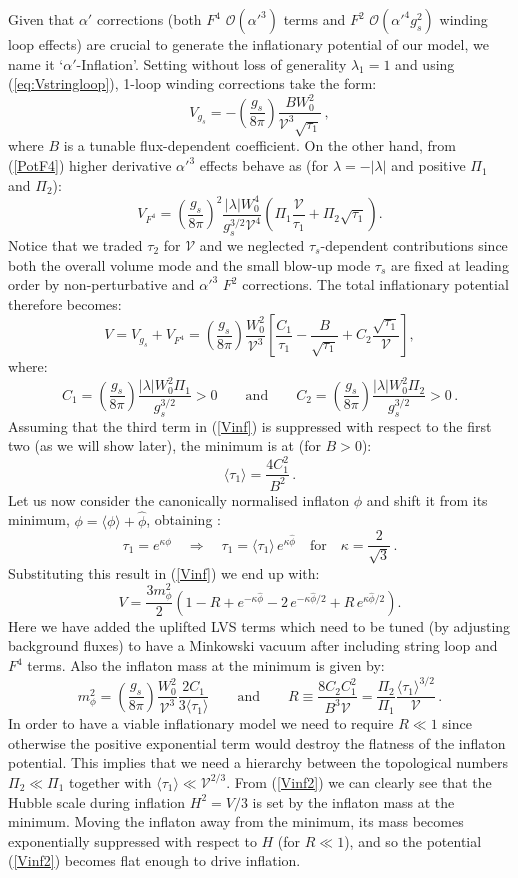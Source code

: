 \documentclass[11pt,a4paper]{article}
\newcommand{\be}{\begin{equation}}
\newcommand{\ee}{\end{equation}}
\newcommand\vo{{\mathcal{V}}}
\newcommand{\mc}{\mathcal}
\begin{document}
Given that $\alpha'$ corrections (both $F^4$ $\mc{O}(\alpha'^3)$ terms and $F^2$ $\mc{O}(\alpha'^4 g_s^2)$ winding loop effects) are crucial to generate the inflationary potential of our model, we name it `$\alpha'$-Inflation'. Setting without loss of generality $\lambda_1=1$ and using (\ref{eq:Vstringloop}), 1-loop winding corrections take the form:
\be
V_{g_s} = - \left(\frac{g_s}{8\pi}\right) \frac{B W_0^2}{\vo^3\sqrt{\tau_1}}\,,
\ee
where $B$ is a tunable flux-dependent coefficient. On the other hand, from (\ref{PotF4}) higher derivative $\alpha'^3$ effects behave as (for $\lambda= -|\lambda|$ and positive $\Pi_1$ and $\Pi_2$):
\be
V_{F^4} = \left(\frac{g_s}{8\pi}\right)^2 \frac{|\lambda| W_0^4}{g_s^{3/2}\vo^4} \left(\Pi_1 \frac{\vo}{\tau_1} + \Pi_2\sqrt{\tau_1}\right).
\ee
Notice that we traded $\tau_2$ for $\vo$ and we neglected $\tau_s$-dependent contributions since both the overall volume mode and the small blow-up mode $\tau_s$ are fixed at leading order by non-perturbative and $\alpha'^3$ $F^2$ corrections. The total inflationary potential therefore becomes:
\be
V = V_{g_s} + V_{F^4} = \left(\frac{g_s}{8\pi}\right) \frac{W_0^2}{\vo^3}\left[\frac{C_1}{\tau_1}-\frac{B}{\sqrt{\tau_1}}+C_2\frac{\sqrt{\tau_1}}{\vo}\right],
\label{Vinf}
\ee
where:
\be
C_1 = \left(\frac{g_s}{8\pi}\right) \frac{|\lambda| W_0^2 \Pi_1}{g_s^{3/2}}>0 \qquad\text{and}\qquad C_2=\left(\frac{g_s}{8\pi}\right) \frac{|\lambda| W_0^2\Pi_2}{g_s^{3/2}}>0\,.
\ee
Assuming that the third term in (\ref{Vinf}) is suppressed with respect to the first two (as we will show later), the minimum is at (for $B>0$):
\be
\langle\tau_1\rangle = \frac{4 C_1^2}{B^2}\,.
\ee
Let us now consider the canonically normalised inflaton $\phi$ and shift it from its minimum, $\phi=\langle\phi\rangle+\hat\phi$, obtaining \cite{Cicoli:2008va}:
\be
\tau_1 = e^{\kappa\phi}\quad\Rightarrow\quad \tau_1 = \langle\tau_1\rangle\,e^{\kappa\hat\phi}\quad\text{for}\quad\kappa=\frac{2}{\sqrt{3}}\,.
\ee
Substituting this result in (\ref{Vinf}) we end up with:
\be
V = \frac{3 m_\phi^2}{2} \left(1-R +e^{-\kappa\hat\phi}- 2 \,e^{-\kappa\hat\phi/2} +R\,e^{\kappa\hat\phi/2}\right).
\label{Vinf2}
\ee
Here we have added the uplifted LVS terms which need to be tuned (by adjusting background fluxes) to have a Minkowski vacuum after including string loop and $F^4$ terms. Also the inflaton mass at the minimum is given by:
\be
m_\phi^2 = \left(\frac{g_s}{8\pi}\right) \frac{W_0^2}{\vo^3}\frac{2 C_1}{3\langle\tau_1\rangle}\qquad\text{and}\qquad R \equiv \frac{8 C_2 C_1^2}{B^3 \vo}
=\frac{\Pi_2}{\Pi_1} \frac{\langle\tau_1\rangle^{3/2}}{\vo}\,.
\label{R}
\ee
In order to have a viable inflationary model we need to require $R\ll 1$ since otherwise the positive exponential term would destroy the flatness of the inflaton potential. This implies that we need a hierarchy between the topological numbers $\Pi_2\ll \Pi_1$ together with $\langle\tau_1\rangle \ll \vo^{2/3}$. From (\ref{Vinf2}) we can clearly see that the Hubble scale during inflation $H^2=V/3$ is set by the inflaton mass at the minimum. Moving the inflaton away from the minimum, its mass becomes exponentially suppressed with respect to $H$ (for $R\ll 1$), and so the potential (\ref{Vinf2}) becomes flat enough to drive inflation.
\end{document}
